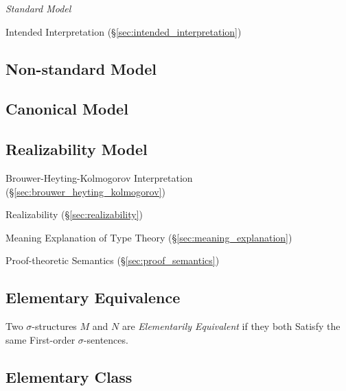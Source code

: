 \emph{Standard Model}

Intended Interpretation (\S\ref{sec:intended_interpretation})



\subsection{Non-standard Model}\label{sec:nonstandard_model}

\subsection{Canonical Model}\label{sec:canonical_model}

\subsection{Realizability Model}\label{sec:realizability_model}

Brouwer-Heyting-Kolmogorov Interpretation
(\S\ref{sec:brouwer_heyting_kolmogorov})

Realizability (\S\ref{sec:realizability})

Meaning Explanation of Type Theory (\S\ref{sec:meaning_explanation})

Proof-theoretic Semantics (\S\ref{sec:proof_semantics})



\subsection{Elementary Equivalence}\label{sec:elementary_equivalence}

Two $\sigma$-structures $M$ and $N$ are \emph{Elementarily Equivalent}
if they both Satisfy the same First-order $\sigma$-sentences.



\subsection{Elementary Class}\label{sec:elementary_class}

